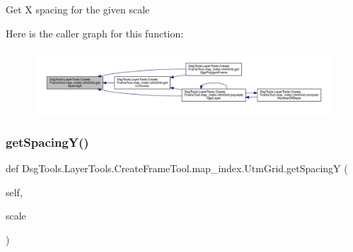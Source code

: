 \begin{DoxyVerb}Get X spacing for the given scale
\end{DoxyVerb}
 Here is the caller graph for this function\+:
\nopagebreak
\begin{figure}[H]
\begin{center}
\leavevmode
\includegraphics[width=350pt]{class_dsg_tools_1_1_layer_tools_1_1_create_frame_tool_1_1map__index_1_1_utm_grid_a678ab9e5c9a2457837c2719eeeb1c0be_icgraph}
\end{center}
\end{figure}
\mbox{\label{class_dsg_tools_1_1_layer_tools_1_1_create_frame_tool_1_1map__index_1_1_utm_grid_ab251ae61488ef7308d8efd2ea02010e8}} 
\subsubsection{\texorpdfstring{get\+Spacing\+Y()}{getSpacingY()}}
{\footnotesize\ttfamily def Dsg\+Tools.\+Layer\+Tools.\+Create\+Frame\+Tool.\+map\+\_\+index.\+Utm\+Grid.\+get\+SpacingY (\begin{DoxyParamCaption}\item[{}]{self,  }\item[{}]{scale }\end{DoxyParamCaption})}

